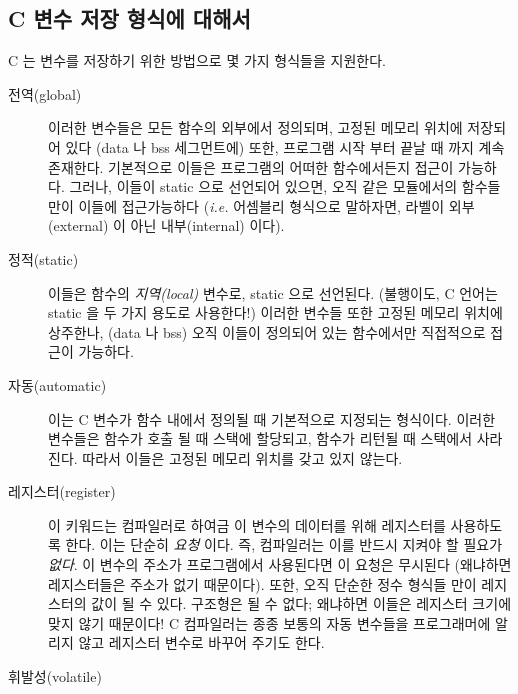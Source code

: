 
\subsection{C 변수 저장 형식에 대해서}

C 는 변수를 저장하기 위한 방법으로 몇 가지 형식들을 지원한다. 
\begin{description}
\item[전역(global)] 
이러한 변수들은 모든 함수의 외부에서 정의되며, 고정된 메모리 위치에
저장되어 있다 ({\code data} 나 {\code bss} 세그먼트에) 또한, 프로그램
시작 부터 끝날 때 까지 계속 존재한다. 기본적으로 이들은 프로그램의 어떠한
함수에서든지 접근이 가능하다. 그러나, 이들이 {\code static} 으로 선언되어
있으면, 오직 같은 모듈에서의 함수들만이 이들에 접근가능하다 (\emph{i.e.}
어셈블리 형식으로 말하자면, 라벨이 외부(external) 이 아닌 내부(internal) 이다).

\item[정적(static)] 

이들은 함수의 \emph{지역(local)} 변수로, {\code static} 으로 선언된다.
(불행이도, C 언어는 {\code static} 을 두 가지 용도로 사용한다!) 이러한 변수들
또한 고정된 메모리 위치에 상주한나, ({\code data} 나 {\code bss}) 오직
이들이 정의되어 있는 함수에서만 직접적으로 접근이 가능하다. 

\item[자동(automatic)] 

이는 C 변수가 함수 내에서 정의될 때 기본적으로 지정되는 형식이다. 이러한 
변수들은 함수가 호출 될 때 스택에 할당되고, 함수가 리턴될 때 스택에서 
사라진다. 따라서 이들은 고정된 메모리 위치를 갖고 있지 않는다. 

\item[레지스터(register)] 

이 키워드는 컴파일러로 하여금 이 변수의 데이터를 위해 레지스터를 사용하도록 한다.
이는 단순히 \emph{요청} 이다. 즉, 컴파일러는 이를 반드시 지켜야 할 필요가 \emph{없다}.
이 변수의 주소가 프로그램에서 사용된다면 이 요청은 무시된다 (왜냐하면 레지스터들은
주소가 없기 때문이다). 또한, 오직 단순한 정수 형식들 만이 레지스터의 값이 될 수 있다. 
구조형은 될 수 없다; 왜냐하면 이들은 레지스터 크기에 맞지 않기 때문이다! C 컴파일러는 종종 보통의
자동 변수들을 프로그래머에 알리지 않고 레지스터 변수로 바꾸어 주기도 한다. 

\item[휘발성(volatile)] 


\end{description}
